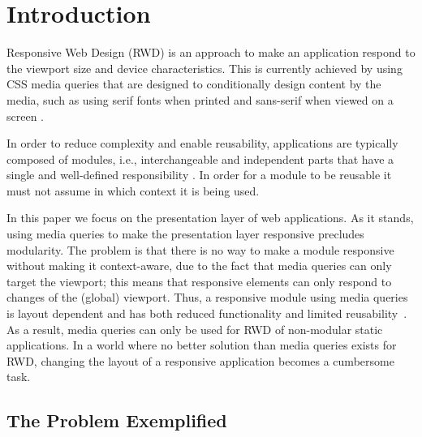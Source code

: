 \documentclass{acm_proc_article-sp}
\begin{document}
\section{Introduction}

  Responsive Web Design (RWD) is an approach to make an application respond to the viewport size and device characteristics.
  This is currently achieved by using CSS media queries that are designed to conditionally design content by the media, such as using serif fonts when printed and sans-serif when viewed on a screen \cite{w3c_css_mq}.

  In order to reduce complexity and enable reusability, applications are typically composed of modules, i.e., interchangeable and independent parts that have a single and well-defined responsibility \cite{parnas1972criteria}.
  In order for a module to be reusable it must not assume in which context it is being used.

  In this paper we focus on the presentation layer of web applications.
  As it stands, using media queries to make the presentation layer responsive precludes modularity.
  The problem is that there is no way to make a module responsive without making it context-aware, due to the fact that media queries can only target the viewport; this means that responsive elements can only respond to changes of the (global) viewport.
  Thus, a responsive module using media queries is layout dependent and has both reduced functionality and limited reusability~\cite{elq-thesis}.
  As a result, media queries can only be used for RWD of non-modular static applications.
  In a world where no better solution than media queries exists for RWD, changing the layout of a responsive application becomes a cumbersome task.

  \subsection{The Problem Exemplified}
    
\end{document}
